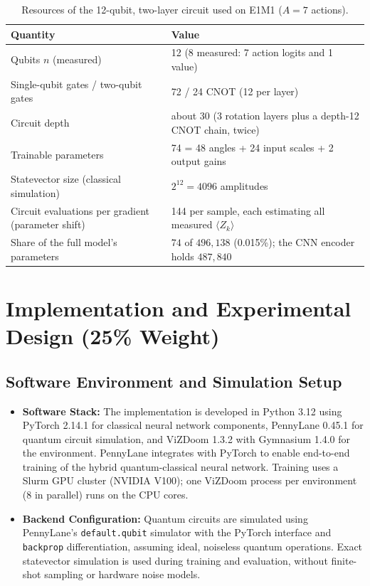 \documentclass[10pt, a4paper]{article}
\begin{document}
\begin{table}[htbp]
\centering
\footnotesize
\renewcommand{\arraystretch}{1.1}
\caption{Resources of the 12-qubit, two-layer circuit used on E1M1 ($A=7$ actions).}
\label{tab:resources}
\begin{tabularx}{\textwidth}{lX}
\toprule
\textbf{Quantity} & \textbf{Value} \\
\midrule
Qubits $n$ (measured) & 12 (8 measured: 7 action logits and 1 value) \\
Single-qubit gates / two-qubit gates & 72 / 24 CNOT (12 per layer) \\
Circuit depth & about 30 (3 rotation layers plus a depth-12 CNOT chain, twice) \\
Trainable parameters & 74 = 48 angles + 24 input scales + 2 output gains \\
Statevector size (classical simulation) & $2^{12}=4096$ amplitudes \\
Circuit evaluations per gradient (parameter shift) & 144 per sample, each estimating all measured $\langle Z_k\rangle$ \\
Share of the full model's parameters & $74$ of $496{,}138$ (0.015\%); the CNN encoder holds $487{,}840$ \\
\bottomrule
\end{tabularx}
\end{table}

\section{Implementation and Experimental Design (25\% Weight)}
\label{sec:implementation_design}

\subsection{Software Environment and Simulation Setup}
\begin{itemize}
    \item \textbf{Software Stack:}
    The implementation is developed in Python 3.12 using PyTorch 2.14.1 for
    classical neural network components, PennyLane 0.45.1 \cite{bergholm_pennylane_2018} for quantum
    circuit simulation, and ViZDoom 1.3.2 with Gymnasium 1.4.0 for the environment. PennyLane integrates with PyTorch to enable
    end-to-end training of the hybrid quantum-classical neural network. Training uses a Slurm GPU cluster (NVIDIA V100); one ViZDoom process
    per environment (8 in parallel) runs on the CPU cores.

    \item \textbf{Backend Configuration:}
    Quantum circuits are simulated using PennyLane's
    \texttt{default.qubit} simulator with the PyTorch interface and \texttt{backprop} differentiation, assuming ideal,
    noiseless quantum operations. Exact statevector simulation
    is used during training and evaluation, without finite-shot sampling
    or hardware noise models.
\end{itemize}
\end{document}
